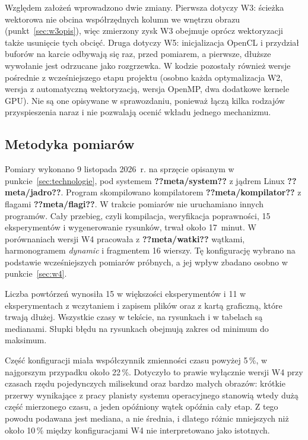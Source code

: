 \documentclass[12pt,a4paper]{article}
\providecommand{\wynik}[1]{\textbf{??#1??}}
\begin{document}
Względem założeń wprowadzono dwie zmiany. Pierwsza dotyczy W3: ścieżka wektorowa nie obcina współrzędnych kolumn we wnętrzu obrazu (punkt~\ref{sec:w3opis}), więc zmierzony zysk W3 obejmuje oprócz wektoryzacji także usunięcie tych obcięć. Druga dotyczy W5: inicjalizacja OpenCL i przydział buforów na karcie odbywają się raz, przed pomiarem, a pierwsze, dłuższe wywołanie jest odrzucane jako rozgrzewka. W kodzie pozostały również wersje pośrednie z wcześniejszego etapu projektu (osobno każda optymalizacja W2, wersja z automatyczną wektoryzacją, wersja OpenMP, dwa dodatkowe kernele GPU). Nie są one opisywane w sprawozdaniu, ponieważ łączą kilka rodzajów przyspieszenia naraz i nie pozwalają ocenić wkładu jednego mechanizmu.

\subsection{Metodyka pomiarów}

Pomiary wykonano 9 listopada 2026~r. na sprzęcie opisanym w punkcie~\ref{sec:technologie}, pod systemem \wynik{meta/system} z jądrem Linux \wynik{meta/jadro}. Program skompilowano kompilatorem \wynik{meta/kompilator} z flagami \wynik{meta/flagi}. W trakcie pomiarów nie uruchamiano innych programów. Cały przebieg, czyli kompilacja, weryfikacja poprawności, 15 eksperymentów i wygenerowanie rysunków, trwał około 17~minut. W porównaniach wersji W4 pracowała z \wynik{meta/watki} wątkami, harmonogramem \emph{dynamic} i fragmentem 16 wierszy. Tę konfigurację wybrano na podstawie wcześniejszych pomiarów próbnych, a jej wpływ zbadano osobno w punkcie~\ref{sec:w4}.

Liczba powtórzeń wynosiła 15 w większości eksperymentów i 11 w eksperymentach z wczytaniem i zapisem plików oraz z kartą graficzną, które trwają dłużej. Wszystkie czasy w tekście, na rysunkach i w tabelach są medianami. Słupki błędu na rysunkach obejmują zakres od minimum do maksimum.

Część konfiguracji miała współczynnik zmienności czasu powyżej 5\,\%, w najgorszym przypadku około 22\,\%. Dotyczyło to prawie wyłącznie wersji W4 przy czasach rzędu pojedynczych milisekund oraz bardzo małych obrazów: krótkie przerwy wynikające z pracy planisty systemu operacyjnego stanowią wtedy dużą część mierzonego czasu, a jeden opóźniony wątek opóźnia cały etap. Z tego powodu podawana jest mediana, a nie średnia, i dlatego różnic mniejszych niż około 10\,\% między konfiguracjami W4 nie interpretowano jako istotnych.
\end{document}
